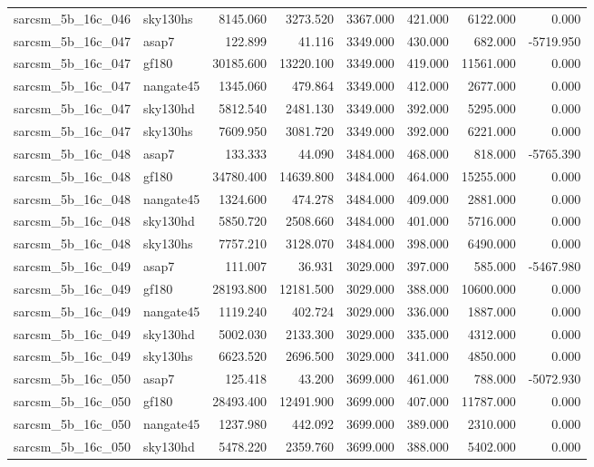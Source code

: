 \begin{tabular}{llrrrrrr}
sarcsm\_5b\_16c\_046 & sky130hs & 8145.060 & 3273.520 & 3367.000 & 421.000 & 6122.000 & 0.000 \\
sarcsm\_5b\_16c\_047 & asap7 & 122.899 & 41.116 & 3349.000 & 430.000 & 682.000 & -5719.950 \\
sarcsm\_5b\_16c\_047 & gf180 & 30185.600 & 13220.100 & 3349.000 & 419.000 & 11561.000 & 0.000 \\
sarcsm\_5b\_16c\_047 & nangate45 & 1345.060 & 479.864 & 3349.000 & 412.000 & 2677.000 & 0.000 \\
sarcsm\_5b\_16c\_047 & sky130hd & 5812.540 & 2481.130 & 3349.000 & 392.000 & 5295.000 & 0.000 \\
sarcsm\_5b\_16c\_047 & sky130hs & 7609.950 & 3081.720 & 3349.000 & 392.000 & 6221.000 & 0.000 \\
sarcsm\_5b\_16c\_048 & asap7 & 133.333 & 44.090 & 3484.000 & 468.000 & 818.000 & -5765.390 \\
sarcsm\_5b\_16c\_048 & gf180 & 34780.400 & 14639.800 & 3484.000 & 464.000 & 15255.000 & 0.000 \\
sarcsm\_5b\_16c\_048 & nangate45 & 1324.600 & 474.278 & 3484.000 & 409.000 & 2881.000 & 0.000 \\
sarcsm\_5b\_16c\_048 & sky130hd & 5850.720 & 2508.660 & 3484.000 & 401.000 & 5716.000 & 0.000 \\
sarcsm\_5b\_16c\_048 & sky130hs & 7757.210 & 3128.070 & 3484.000 & 398.000 & 6490.000 & 0.000 \\
sarcsm\_5b\_16c\_049 & asap7 & 111.007 & 36.931 & 3029.000 & 397.000 & 585.000 & -5467.980 \\
sarcsm\_5b\_16c\_049 & gf180 & 28193.800 & 12181.500 & 3029.000 & 388.000 & 10600.000 & 0.000 \\
sarcsm\_5b\_16c\_049 & nangate45 & 1119.240 & 402.724 & 3029.000 & 336.000 & 1887.000 & 0.000 \\
sarcsm\_5b\_16c\_049 & sky130hd & 5002.030 & 2133.300 & 3029.000 & 335.000 & 4312.000 & 0.000 \\
sarcsm\_5b\_16c\_049 & sky130hs & 6623.520 & 2696.500 & 3029.000 & 341.000 & 4850.000 & 0.000 \\
sarcsm\_5b\_16c\_050 & asap7 & 125.418 & 43.200 & 3699.000 & 461.000 & 788.000 & -5072.930 \\
sarcsm\_5b\_16c\_050 & gf180 & 28493.400 & 12491.900 & 3699.000 & 407.000 & 11787.000 & 0.000 \\
sarcsm\_5b\_16c\_050 & nangate45 & 1237.980 & 442.092 & 3699.000 & 389.000 & 2310.000 & 0.000 \\
sarcsm\_5b\_16c\_050 & sky130hd & 5478.220 & 2359.760 & 3699.000 & 388.000 & 5402.000 & 0.000 \\

\end{tabular}
